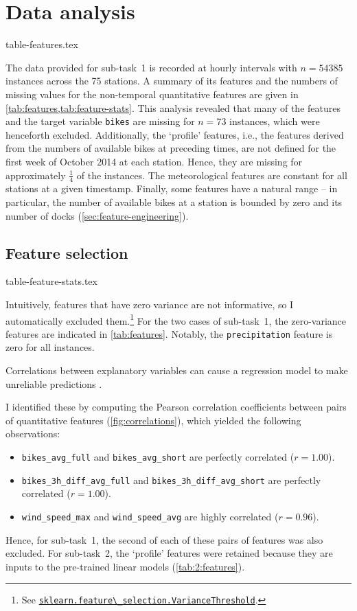 \documentclass[11pt]{extarticle}
\newcommand{\windspeedmax}{\texttt{wind\_speed\_max}}
\newcommand{\windspeedavg}{\texttt{wind\_speed\_avg}}
\newcommand{\bikesavgfull}{\texttt{bikes\_avg\_full}}
\newcommand{\bikesavgshort}{\texttt{bikes\_avg\_short}}
\newcommand{\bikeshdiffavgfull}{\texttt{bikes\_3h\_diff\_avg\_full}}
\newcommand{\bikeshdiffavgshort}{\texttt{bikes\_3h\_diff\_avg\_short}}
\newcommand{\sklearn}[2]{\href{https://scikit-learn.org/stable/modules/generated/sklearn.#1.#2.html}{\lstinline|sklearn.#1.#2|}}
\begin{document}
\section{Data analysis}
\label{sec:data-analysis}

{table-features.tex}

The data provided for sub-task~1 is recorded at hourly intervals with $n = 54385$
instances across the 75 stations.
A summary of its features and the numbers of missing values for the non-temporal
quantitative features are given in \cref{tab:features,tab:feature-stats}.
This analysis revealed that many of the features and the target variable \texttt{bikes}
are missing for $n = 73$ instances, which were henceforth excluded.
Additionally, the `profile' features, i.e., the features derived from the numbers of
available bikes at preceding times, are not defined for the first week of October 2014
at each station.
Hence, they are missing for approximately $\frac{1}{4}$ of the instances.
The meteorological features are constant for all stations at a given timestamp.
Finally, some features have a natural range -- in particular, the number of available
bikes at a station is bounded by zero and its number of docks
(\cref{sec:feature-engineering}).

\subsection{Feature selection}
\label{sec:feature-selection}

{table-feature-stats.tex}

Intuitively, features that have zero variance are not informative, so I automatically
excluded them.\footnote{See \sklearn{feature\_selection}{VarianceThreshold}.
}
For the two cases of sub-task~1, the zero-variance features are indicated in
\cref{tab:features}.
Notably, the \texttt{precipitation} feature is zero for all instances.

Correlations between explanatory variables can cause a regression model to make
unreliable predictions \parencite{Alin2010}.
\begin{samepage}
  I identified these by computing the Pearson correlation
  coefficients between pairs of quantitative features (\cref{fig:correlations}), which
  yielded the following observations:
  \begin{itemize}
    \item \texttt{\bikesavgfull} and \texttt{\bikesavgshort} are perfectly correlated ($r = 1.00$).
    \item \texttt{\bikeshdiffavgfull} and \texttt{\bikeshdiffavgshort} are perfectly correlated ($r  = 1.00$).
    \item \texttt{\windspeedmax} and \texttt{\windspeedavg} are highly correlated ($r = 0.96$).
  \end{itemize}
\end{samepage}
Hence, for sub-task~1, the second of each of these pairs of features was also excluded.
For sub-task~2, the `profile' features were retained because they are inputs to the
pre-trained linear models (\cref{tab:2:features}).
\end{document}
